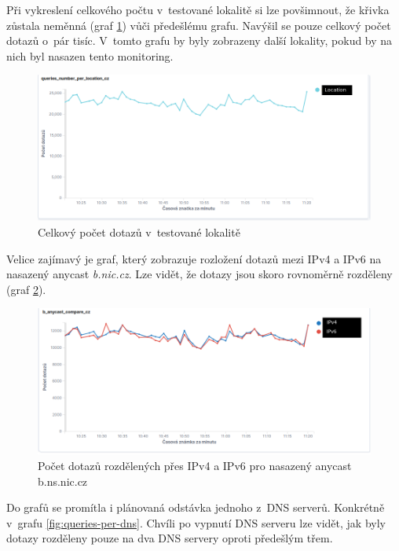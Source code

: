 \documentclass[thesis=M,czech]{src/FITthesis}[2019/12/23]
\begin{document}
Při vykreslení celkového počtu v~testované lokalitě si lze povšimnout, že křivka zůstala neměnná (graf \ref{fig:queries-per-location}) vůči předešlému grafu. Navýšil se pouze celkový počet dotazů o~pár tisíc. V~tomto grafu by byly zobrazeny další lokality, pokud by na nich byl nasazen tento monitoring.

\begin{figure}[ht]
  \centering
   \includegraphics[width=1\textwidth]{images/queries-per-location.png}
   \caption{Celkový počet dotazů v~testované lokalitě}
     \label{fig:queries-per-location}
\end{figure}


Velice zajímavý je graf, který zobrazuje rozložení dotazů mezi IPv4 a IPv6 na nasazený anycast \textit{b.nic.cz}. Lze vidět, že dotazy jsou skoro rovnoměrně rozděleny (graf \ref{fig:queries-per-ip}). 

\begin{figure}[ht]
  \centering
   \includegraphics[width=1\textwidth]{images/queries-per-ip.png}
   \caption{Počet dotazů rozdělených přes IPv4 a IPv6 pro nasazený anycast b.ns.nic.cz}
     \label{fig:queries-per-ip}
\end{figure}

Do grafů se promítla i plánovaná odstávka jednoho z~DNS serverů. \linebreak Konkrétně v~grafu \ref{fig:queries-per-dns}. Chvíli po vypnutí DNS serveru lze vidět, jak byly dotazy rozděleny pouze na dva DNS servery oproti předešlým třem.
\end{document}
